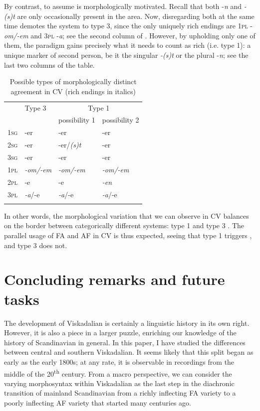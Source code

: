 \documentclass[output=paper,colorlinks,citecolor=brown,draft,draftmode]{langscibook}
\begin{document}
By contrast, to assume  is morphologically motivated. Recall that both -\textit{n} and \textit{-(s)t} are only occasionally present in the area. Now, disregarding both at the same time demotes the  system to type 3, since the only uniquely rich endings are 1\textsc{pl} -\textit{om/-em} and 3\textsc{pl} -\textit{a}; see the second column of . However, by upholding only one of them, the paradigm gains precisely what it needs to count as rich (i.e. type 1): a unique marker of second person, be it the singular \textit{-(s)t} or the plural -\textit{n}; see the last two columns of the table.


\begin{table}
\caption{Possible types of morphologically distinct agreement in CV (rich endings in italics)\label{tab:petzell:4}}
\begin{tabular}{>{\scshape}llll}
\lsptoprule
& Type 3 & \multicolumn{2}{c}{Type 1}\\\cmidrule(lr){3-4}
&  & possibility 1 & possibility 2\\
\midrule
1sg & -er & -er & -er\\
2sg & -er & -er/\textit{(s)t} & -er\\
3sg & -er & -er & -er\\
1pl & \textit{-om/-em} & \textit{-om/-em} & \textit{-om/-em}\\
2pl & -e & -e & \textit{-en}\\
3pl & \textit{-a}/-e & \textit{-a}/-e & \textit{-a}/-e\\
\lspbottomrule
\end{tabular}
\end{table}

In other words, the morphological variation that we can observe in CV balances on the border between categorically different systems: type 1 and type 3 . The parallel usage of FA and AF in CV is thus expected, seeing that type 1  triggers , and type 3 does not.


\section{Concluding remarks and future tasks}\label{sec:petzell:6}


The development of Viskadalian is certainly a linguistic history in its own right. However, it is also a piece in a larger puzzle, enriching our knowledge of the history of Scandinavian in general. In this paper, I have studied the differences between central and southern Viskadalian. It seems likely that this  split began as early as the early 1800s; at any rate, it is observable in recordings from the middle of the 20\textsuperscript{th} century. From a macro perspective, we can consider the varying morphosyntax within Viskadalian as the last step in the diachronic transition of mainland Scandinavian from a richly inflecting FA variety to a poorly inflecting AF variety that started many centuries ago. 
\end{document}
